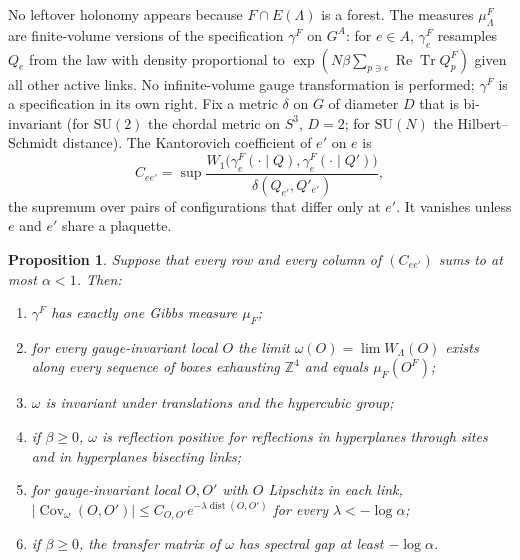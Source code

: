 \documentclass[aps,prd,twocolumn,superscriptaddress,nofootinbib,longbibliography,floatfix,amsmath,amssymb,10pt]{revtex4-2}
\newtheorem{proposition}[theorem]{Proposition}
\theoremstyle{definition}
\theoremstyle{remark}
\newcommand{\Z}{\mathbb{Z}}
\newcommand{\SU}{\mathrm{SU}}
\newcommand{\ReTr}{\operatorname{Re}\operatorname{Tr}}
\newcommand{\Cov}{\operatorname{Cov}}
\newcommand{\dist}{\operatorname{dist}}
\begin{document}
No leftover holonomy appears because $F\cap E(\Lambda)$ is a forest. The
measures $\mu^F_\Lambda$ are finite-volume versions of the specification
$\gamma^F$ on $G^A$: for $e\in A$, $\gamma^F_e$ resamples $Q_e$ from the law
with density proportional to $\exp(N\beta\sum_{p\ni e}\ReTr Q^F_p)$ given all
other active links. No infinite-volume gauge transformation is performed;
$\gamma^F$ is a specification in its own right. Fix a metric $\delta$ on $G$
of diameter $D$ that is bi-invariant (for $\SU(2)$ the chordal metric on
$S^3$, $D=2$; for $\SU(N)$ the Hilbert--Schmidt distance). The Kantorovich
coefficient of $e'$ on $e$ is
\[
C_{ee'}=\sup\frac{W_1\bigl(\gamma^F_e(\cdot\mid Q),\gamma^F_e(\cdot\mid
Q')\bigr)}{\delta(Q_{e'},Q'_{e'})},
\]
the supremum over pairs of configurations that differ only at $e'$. It
vanishes unless $e$ and $e'$ share a plaquette.

\begin{proposition}\label{prop:state}
Suppose that every row and every column of $(C_{ee'})$ sums to at most
$\alpha<1$. Then:
\begin{enumerate}[label=\textup{(\roman*)},leftmargin=*]
\item $\gamma^F$ has exactly one Gibbs measure $\mu_F$;
\item for every gauge-invariant local $O$ the limit $\omega(O)=\lim
W_\Lambda(O)$ exists along every sequence of boxes exhausting $\Z^4$ and
equals $\mu_F(O^F)$;
\item $\omega$ is invariant under translations and the hypercubic group;
\item if $\beta\ge0$, $\omega$ is reflection positive for reflections in
hyperplanes through sites and in hyperplanes bisecting links;
\item for gauge-invariant local $O,O'$ with $O$ Lipschitz in each link,
$|\Cov_\omega(O,O')|\le C_{O,O'}e^{-\lambda\dist(O,O')}$ for every
$\lambda<-\log\alpha$;
\item if $\beta\ge0$, the transfer matrix of $\omega$ has spectral gap at
least $-\log\alpha$.
\end{enumerate}
\end{proposition}
\end{document}
